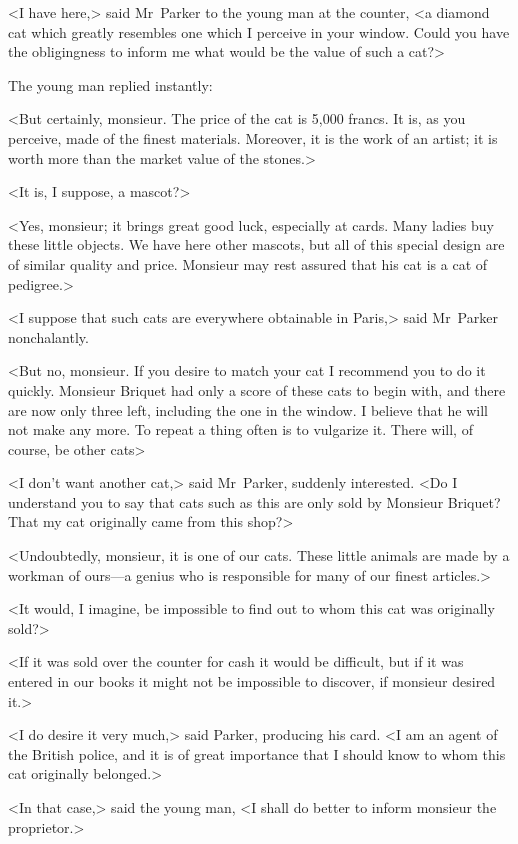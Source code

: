 <I have here,> said Mr~Parker to the young man at the counter, <a diamond cat which greatly resembles one which I perceive in your window. Could you have the obligingness to inform me what would be the value of such a cat?>

The young man replied instantly:

<But certainly, monsieur. The price of the cat is 5,000 francs. It is, as you perceive, made of the finest materials. Moreover, it is the work of an artist; it is worth more than the market value of the stones.>

<It is, I suppose, a mascot?>

<Yes, monsieur; it brings great good luck, especially at cards. Many ladies buy these little objects. We have here other mascots, but all of this special design are of similar quality and price. Monsieur may rest assured that his cat is a cat of pedigree.>

<I suppose that such cats are everywhere obtainable in Paris,> said Mr~Parker nonchalantly.

<But no, monsieur. If you desire to match your cat I recommend you to do it quickly. Monsieur Briquet had only a score of these cats to begin with, and there are now only three left, including the one in the window. I believe that he will not make any more. To repeat a thing often is to vulgarize it. There will, of course, be other cats\longdash>

<I don't want another cat,> said Mr~Parker, suddenly interested. <Do I understand you to say that cats such as this are only sold by Monsieur Briquet? That my cat originally came from this shop?>

<Undoubtedly, monsieur, it is one of our cats. These little animals are made by a workman of ours—a genius who is responsible for many of our finest articles.>

<It would, I imagine, be impossible to find out to whom this cat was originally sold?>

<If it was sold over the counter for cash it would be difficult, but if it was entered in our books it might not be impossible to discover, if monsieur desired it.>

<I do desire it very much,> said Parker, producing his card. <I am an agent of the British police, and it is of great importance that I should know to whom this cat originally belonged.>

<In that case,> said the young man, <I shall do better to inform monsieur the proprietor.>

